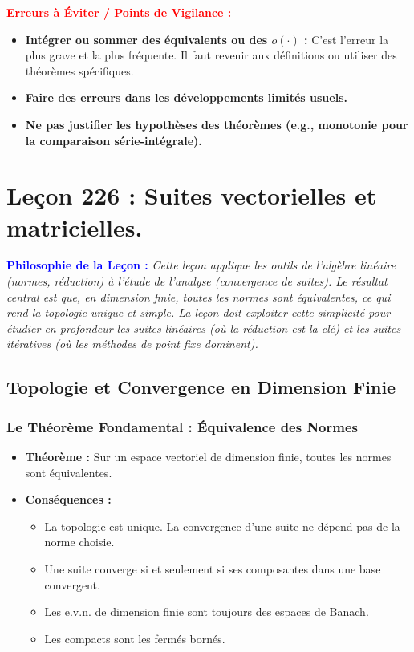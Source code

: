 \documentclass[12pt, a4paper, parskip=full]{report}
\theoremstyle{agregstyle}
\newenvironment{philosophie}
  {\par\medskip\noindent\begin{oframed}\noindent\textbf{\textcolor{blue}{Philosophie de la Leçon :}}\itshape}
  {\end{oframed}\par\medskip}
\newenvironment{erreurs}
  {\par\medskip\noindent\begin{oframed}\noindent\textbf{\textcolor{red}{Erreurs à Éviter / Points de Vigilance :}}}
  {\end{oframed}\par\medskip}
\begin{document}
\begin{erreurs}
    \begin{itemize}
        \item \textbf{Intégrer ou sommer des équivalents ou des $o(\cdot)$ :} C'est l'erreur la plus grave et la plus fréquente. Il faut revenir aux définitions ou utiliser des théorèmes spécifiques.
        \item \textbf{Faire des erreurs dans les développements limités usuels.}
        \item \textbf{Ne pas justifier les hypothèses des théorèmes (e.g., monotonie pour la comparaison série-intégrale).}
    \end{itemize}
\end{erreurs}
\chapter{Leçon 226 : Suites vectorielles et matricielles.}

\begin{philosophie}
    Cette leçon applique les outils de l'algèbre linéaire (normes, réduction) à l'étude de l'analyse (convergence de suites). Le résultat central est que, en dimension finie, toutes les normes sont équivalentes, ce qui rend la topologie unique et simple. La leçon doit exploiter cette simplicité pour étudier en profondeur les suites linéaires (où la réduction est la clé) et les suites itératives (où les méthodes de point fixe dominent).
\end{philosophie}

\section{Topologie et Convergence en Dimension Finie}
\subsection{Le Théorème Fondamental : Équivalence des Normes}
\begin{itemize}
    \item \textbf{Théorème :} Sur un espace vectoriel de dimension finie, toutes les normes sont équivalentes.
    \item \textbf{Conséquences :}
        \begin{itemize}
            \item La topologie est unique. La convergence d'une suite ne dépend pas de la norme choisie.
            \item Une suite converge si et seulement si ses composantes dans une base convergent.
            \item Les e.v.n. de dimension finie sont toujours des espaces de Banach.
            \item Les compacts sont les fermés bornés.
        \end{itemize}
\end{itemize}
\end{document}
